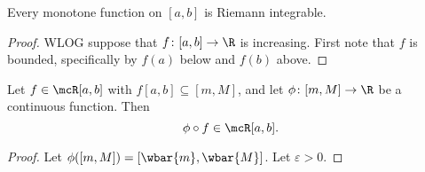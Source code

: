 \begin{exercise}
    Every monotone function on $[a, b]$ is Riemann integrable.
\end{exercise}
\begin{proof}
    WLOG suppose that $f\colon [a, b] \to \R$ is increasing.
    First note that $f$ is bounded, specifically by $f(a)$ below and
    $f(b)$ above.
\end{proof}

\begin{theorem*}
    Let $f \in \mcR[a, b]$ with $f[a, b] \subseteq [m, M]$, and
    let $\phi\colon [m, M] \to \R$ be a continuous function.
    Then \[
        \phi \circ f \in \mcR[a, b].
    \]
\end{theorem*}
\begin{proof}
    Let $\phi([m, M]) = [\wbar{m}, \wbar{M}]$.
    Let $\varepsilon > 0$.
\end{proof}
